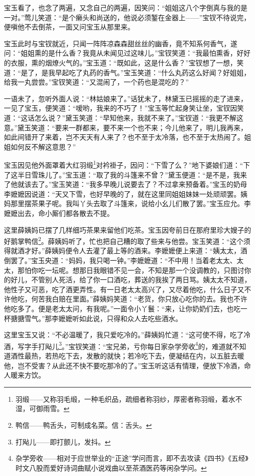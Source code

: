 \par 宝玉看了，也念了两遍，又念自己的两遍，因笑问：“姐姐这八个字倒真与我的是一对。”莺儿笑道：“是个癞头和尚送的，他说必须錾在金器上——”宝钗不待说完，便嗔他不去倒茶，一面又问宝玉从那里来。
\par 宝玉此时与宝钗就近，只闻一阵阵凉森森甜丝丝的幽香，竟不知系何香气，遂问：“姐姐熏的是什么香？我竟从未闻见过这味儿。”宝钗笑道：“我最怕熏香，好好的衣服，熏的烟燎火气的。”宝玉道：“既如此，这是什么香？”宝钗想了一想，笑道：“是了，是我早起吃了丸药的香气。”宝玉笑道：“什么丸药这么好闻？好姐姐，给我一丸尝尝。”宝钗笑道：“又混闹了，一个药也是混吃的？”
\par 一语未了，忽听外面人说：“林姑娘来了。”话犹未了，林黛玉已摇摇的走了进来，一见了宝玉，便笑道：“嗳哟，我来的不巧了！”宝玉等忙起身笑让坐，宝钗因笑道：“这话怎么说？”黛玉笑道：“早知他来，我就不来了。”宝钗道：“我更不解这意。”黛玉笑道：“要来一群都来，要不来一个也不来；今儿他来了，明儿我再来，如此间错开了来着，岂不天天有人来了？也不至于太冷落，也不至于太热闹了。姐姐如何反不解这意思？”
\par 宝玉因见他外面罩着大红羽缎\footnote{羽缎——又称羽毛缎，一种毛织品，疏细者称羽纱，厚密者称羽缎，着水不湿，可御雨雪。}对衿褂子，因问：“下雪了么？”地下婆娘们道：“下了这半日雪珠儿了。”宝玉道：“取了我的斗篷来不曾？”黛玉便道：“是不是，我来了他就该去了。”宝玉笑道：“我多早晚儿说要去了？不过拿来预备着。”宝玉的奶母李嬷嬷因说道：“天又下雪，也好早晚的了，就在这里同姐姐妹妹一处顽顽罢。姨妈那里摆茶果子呢。我叫丫头去取了斗篷来，说给小幺儿们散了罢。”宝玉应允。李嬷嬷出去，命小厮们都各散去不提。
\par 这里薛姨妈已摆了几样细巧茶果来留他们吃茶。宝玉因夸前日在那府里珍大嫂子的好鹅掌鸭信\footnote{鸭信——鸭舌头，可制成名菜。信：舌头。}。薛姨妈听了，忙也把自己糟的取了些来与他尝。宝玉笑道：“这个须得就酒才好。”薛姨妈便令人去灌了最上等的酒来。李嬷嬷便上来道：“姨太太，酒倒罢了。”宝玉央道：“妈妈，我只喝一钟。”李嬷嬷道：“不中用！当着老太太、太太，那怕你吃一坛呢。想那日我眼错不见一会，不知是那一个没调教的，只图讨你的好儿，不管别人死活，给了你一口酒吃，葬送的我挨了两日骂。姨太太不知道，他性子又可恶，吃了酒更弄性。有一日老太太高兴了，又尽着他吃，什么日子又不许他吃，何苦我白赔在里面。”薛姨妈笑道：“老货，你只放心吃你的去。我也不许他吃多了。便是老太太问，有我呢。”一面令小丫鬟：“来，让你奶奶们去，也吃一杯搪搪雪气。”那李嬷嬷听如此说，只得和众人去吃些酒水。
\par 这里宝玉又说：“不必温暖了，我只爱吃冷的。”薛姨妈忙道：“这可使不得，吃了冷酒，写字手打飐儿\footnote{打飐儿——即打颤儿，发抖。}。”宝钗笑道：“宝兄弟，亏你每日家杂学旁收\footnote{杂学旁收——相对于应世举业的“正途”学问而言，即不去攻读《四书》《五经》时文八股而爱好诗词曲赋小说戏曲以至茶酒医药等闲杂学问。}的，难道就不知道酒性最热，若热吃下去，发散的就快；若冷吃下去，便凝结在内，以五脏去暖他，岂不受害？从此还不快不要吃那冷的了。”宝玉听这话有情理，便放下冷酒，命人暖来方饮。
